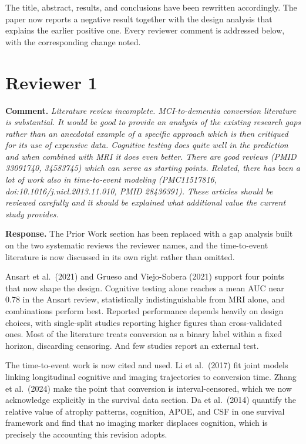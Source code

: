 \documentclass[11pt]{article}
\newcommand{\comment}[1]{\vspace{6pt}\noindent\textbf{Comment.} \textit{#1}\par\vspace{2pt}}
\newcommand{\response}{\noindent\textbf{Response.} }
\begin{document}
The title, abstract, results, and conclusions have been rewritten accordingly. The paper now reports a negative result together with the design analysis that explains the earlier positive one. Every reviewer comment is addressed below, with the corresponding change noted.

\section*{Reviewer 1}

\comment{Literature review incomplete. MCI-to-dementia conversion literature is substantial. It would be good to provide an analysis of the existing research gaps rather than an anecdotal example of a specific approach which is then critiqued for its use of expensive data. Cognitive testing does quite well in the prediction and when combined with MRI it does even better. There are good reviews (PMID 33091740, 34583745) which can serve as starting points. Related, there has been a lot of work also in time-to-event modeling (PMC11517816, doi:10.1016/j.nicl.2013.11.010, PMID 28436391). These articles should be reviewed carefully and it should be explained what additional value the current study provides.}

\response The Prior Work section has been replaced with a gap analysis built on the two systematic reviews the reviewer names, and the time-to-event literature is now discussed in its own right rather than omitted.

Ansart et al.\ (2021) and Grueso and Viejo-Sobera (2021) support four points that now shape the design. Cognitive testing alone reaches a mean AUC near 0.78 in the Ansart review, statistically indistinguishable from MRI alone, and combinations perform best. Reported performance depends heavily on design choices, with single-split studies reporting higher figures than cross-validated ones. Most of the literature treats conversion as a binary label within a fixed horizon, discarding censoring. And few studies report an external test.

The time-to-event work is now cited and used. Li et al.\ (2017) fit joint models linking longitudinal cognitive and imaging trajectories to conversion time. Zhang et al.\ (2024) make the point that conversion is interval-censored, which we now acknowledge explicitly in the survival data section. Da et al.\ (2014) quantify the relative value of atrophy patterns, cognition, APOE, and CSF in one survival framework and find that no imaging marker displaces cognition, which is precisely the accounting this revision adopts.
\end{document}

